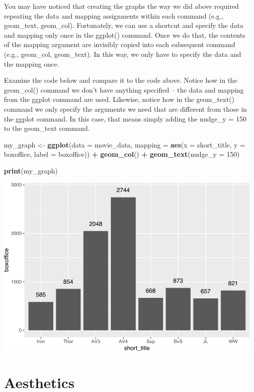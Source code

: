 \documentclass[
]{krantz}
\makeatletter
\newenvironment{Shaded}{\begin{snugshade}}{\end{snugshade}}
\newcommand{\DataTypeTok}[1]{\textcolor[rgb]{0.27,0.27,0.27}{#1}}
\newcommand{\DecValTok}[1]{\textcolor[rgb]{0.06,0.06,0.06}{#1}}
\newcommand{\KeywordTok}[1]{\textcolor[rgb]{0.27,0.27,0.27}{\textbf{#1}}}
\newcommand{\NormalTok}[1]{#1}
\newcommand{\OperatorTok}[1]{\textcolor[rgb]{0.43,0.43,0.43}{\textbf{#1}}}
\newcommand{\StringTok}[1]{\textcolor[rgb]{0.5,0.5,0.5}{#1}}
\newenvironment{kframe}{%
\medskip{}
\setlength{\fboxsep}{.8em}
 \def\at@end@of@kframe{}%
 \ifinner\ifhmode%
  \def\at@end@of@kframe{\end{minipage}}%
  \begin{minipage}{\columnwidth}%
 \fi\fi%
 \def\FrameCommand##1{\hskip\@totalleftmargin \hskip-\fboxsep
 \colorbox{shadecolor}{##1}\hskip-\fboxsep
     \hskip-\linewidth \hskip-\@totalleftmargin \hskip\columnwidth}%
 \MakeFramed {\advance\hsize-\width
   \@totalleftmargin\z@ \linewidth\hsize
   \@setminipage}}%
 {\par\unskip\endMakeFramed%
 \at@end@of@kframe}
\renewenvironment{Shaded}{\begin{kframe}}{\end{kframe}}
\makeatother
\begin{document}
You may have noticed that creating the graphs the way we did above required repeating the data and mapping assignments within each command (e.g., geom\_text, geom\_col). Fortunately, we can use a shortcut and specify the data and mapping only once in the ggplot() command. Once we do that, the contents of the mapping argument are invisibly copied into each subsequent command (e.g., geom\_col, geom\_text). In this way, we only have to specify the data and the mapping once.

Examine the code below and compare it to the code above. Notice how in the geom\_col() command we don't have anything specified -- the data and mapping from the ggplot command are used. Likewise, notice how in the geom\_text() command we only specify the arguments we need that are different from those in the ggplot command. In this case, that means simply adding the nudge\_y = 150 to the geom\_text command.

\begin{Shaded}
\begin{Highlighting}[]
\NormalTok{my_graph <-}\StringTok{ }\KeywordTok{ggplot}\NormalTok{(}\DataTypeTok{data =}\NormalTok{ movie_data,}
           \DataTypeTok{mapping =} \KeywordTok{aes}\NormalTok{(}\DataTypeTok{x =}\NormalTok{ short_title,}
                         \DataTypeTok{y =}\NormalTok{ boxoffice,}
                         \DataTypeTok{label =}\NormalTok{ boxoffice)) }\OperatorTok{+}
\StringTok{  }\KeywordTok{geom_col}\NormalTok{() }\OperatorTok{+}
\StringTok{  }\KeywordTok{geom_text}\NormalTok{(}\DataTypeTok{nudge_y =} \DecValTok{150}\NormalTok{) }

\KeywordTok{print}\NormalTok{(my_graph)}
\end{Highlighting}
\end{Shaded}

\includegraphics[width=0.65\linewidth]{bookdown_files/figure-latex/unnamed-chunk-255-1}

\hypertarget{aesthetics}{%
\section{Aesthetics}\label{aesthetics}}
\end{document}
